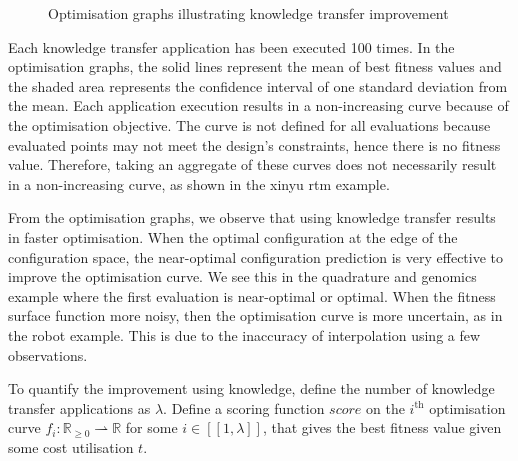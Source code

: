 \documentclass[10pt,a4paper]{article}
\newcommand{\dsb}[1]{[\![#1]\!]}
\begin{document}
\begin{figure}[H]
	 \begin{center}
	\end{center}
	\caption{Optimisation graphs illustrating knowledge transfer improvement}
	\label{fig:subfigures}
\end{figure}

Each knowledge transfer application has been executed 100 times. In the optimisation graphs, the solid lines represent the mean of best fitness values and the shaded area represents the confidence interval of one standard deviation from the mean. Each application execution results in a non-increasing curve because of the optimisation objective. The curve is not defined for all evaluations because evaluated points may not meet the design's constraints, hence there is no fitness value. Therefore, taking an aggregate of these curves does not necessarily result in a non-increasing curve, as shown in the xinyu rtm example.

From the optimisation graphs, we observe that using knowledge transfer results in faster optimisation. When the optimal configuration at the edge of the configuration space, the near-optimal configuration prediction is very effective to improve the optimisation curve. We see this in the quadrature and genomics example where the first evaluation is near-optimal or optimal. When the fitness surface function more noisy, then the optimisation curve is more uncertain, as in the robot example. This is due to the inaccuracy of interpolation using a few observations.

To quantify the improvement using knowledge, define the number of knowledge transfer applications as $\lambda$. Define a scoring function $score$ on the $i^{\text{th}}$ optimisation curve $f_i:\mathbb{R}_{\ge 0}\rightharpoonup\mathbb{R}$ for some $i\in\dsb{1,\lambda}$, that gives the best fitness value given some cost utilisation $t$.
\end{document}

